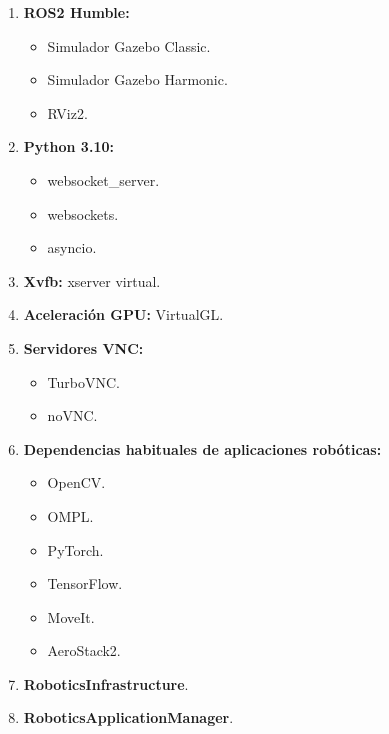 \begin{enumerate}
    \item \textbf{ROS2 Humble:}
    \begin{itemize}
        \item Simulador Gazebo Classic.
        \item Simulador Gazebo Harmonic.
        \item RViz2.
    \end{itemize}
    \item \textbf{Python 3.10:}
    \begin{itemize}
        \item websocket\_server.
        \item websockets.
        \item asyncio.
    \end{itemize}
    \item \textbf{Xvfb:} xserver virtual. 
    \item \textbf{Aceleración GPU:} VirtualGL.
    \item \textbf{Servidores VNC:}
    \begin{itemize}
        \item TurboVNC.
        \item noVNC.
    \end{itemize}
    \item \textbf{Dependencias habituales de aplicaciones robóticas:}
    \begin{itemize}
        \item OpenCV.
        \item OMPL.
        \item PyTorch.
        \item TensorFlow.
        \item MoveIt.
        \item AeroStack2.
    \end{itemize}
    \item \textbf{RoboticsInfrastructure}.
    \item \textbf{RoboticsApplicationManager}.
\end{enumerate}
